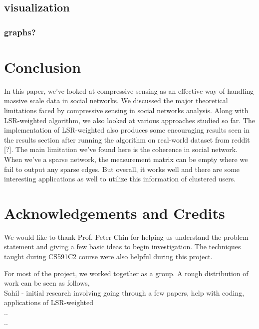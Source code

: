 \documentclass{article}
\begin{document}
\subsection{visualization}


\subsubsection{graphs?}



\section{Conclusion}
In this paper, we've looked at compressive sensing as an effective way of handling massive scale data in social
networks. We discussed the major theoretical limitations faced by compressive sensing in social networks analysis. Along
with LSR-weighted algorithm, we also looked at various approaches studied so far. The implementation of LSR-weighted
also produces some encouraging results seen in the results section after running the algorithm on real-world dataset
from reddit [?]. The main limitation we've found here is the
coherence in social network. When we've a sparse network, the measurement matrix can be empty where we fail to output
any sparse edges. But overall, it works well and there are some interesting applications as well to utilize this
information of clustered users. 

\section{Acknowledgements and Credits}
We would like to thank Prof. Peter Chin for helping us understand the problem statement and giving a few basic ideas to
begin investigation. The techniques taught during CS591C2 course were also helpful during this project. 

For most of the project, we worked together as a group. A rough distribution of work can be seen as follows, \\
Sahil - initial research involving going through a few papers, help with coding, applications of LSR-weighted \\
..\\
.. \\
\end{document}
